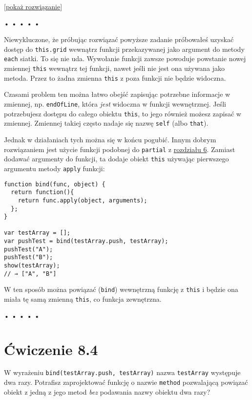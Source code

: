   
[\hyperref[sol:8.3]{pokaż rozwiązanie}]
  


\begin{center}
• • • • •
\end{center}

  
Niewykluczone, że próbując rozwiązać powyższe zadanie próbowałeś uzyskać dostęp do \texttt{this.grid} wewnątrz funkcji przekazywanej jako argument do metody \texttt{each} siatki. To się nie uda. Wywołanie funkcji zawsze powoduje powstanie nowej zmiennej \texttt{this} wewnątrz tej funkcji, nawet jeśli nie jest ona używana jako metoda. Przez to żadna zmienna \texttt{this} z poza funkcji nie będzie widoczna.

  
Czasami problem ten można łatwo obejść zapisując potrzebne informacje w zmiennej, np. \texttt{endOfLine}, która \emph{jest} widoczna w funkcji wewnętrznej. Jeśli potrzebujesz dostępu do całego obiektu \texttt{this}, to jego również możesz zapisać w zmiennej. Zmiennej takiej często nadaje się nazwę \texttt{self} (albo \texttt{that}).

  
Jednak w działaniach tych można się w końcu pogubić. Innym dobrym rozwiązaniem jest użycie funkcji podobnej do \texttt{partial} z \hyperref[chap:6]{rozdziału 6}. Zamiast dodawać argumenty do funkcji, ta dodaje obiekt \texttt{this} używając pierwszego argumentu metody \texttt{apply} funkcji:

  
\begin{verbatim} 
function bind(func, object) {
  return function(){
    return func.apply(object, arguments);
  };
}

var testArray = [];
var pushTest = bind(testArray.push, testArray);
pushTest("A");
pushTest("B");
show(testArray);
// → ["A", "B"]
\end{verbatim}
  
W ten sposób można powiązać (\texttt{bind}) wewnętrzną funkcję z \texttt{this} i będzie ona miała tę samą zmienną \texttt{this}, co funkcja zewnętrzna.



\begin{center}
• • • • •
\end{center}

  
\section*{Ćwiczenie 8.4}
\label{sec:8.4}
  
    
W wyrażeniu \texttt{bind(testArray.push, testArray)} nazwa \texttt{testArray} występuje dwa razy. Potrafisz zaprojektować funkcję o nazwie \texttt{method} pozwalającą powiązać obiekt z jedną z jego metod \emph{bez} podawania nazwy obiektu dwa razy?

